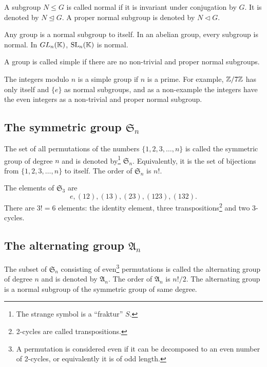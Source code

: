 \begin{definition}
A subgroup $N \leq G$ is called normal if it is invariant under conjugation by $G$. It is denoted by $N \trianglelefteq G$. A proper normal subgroup is denoted by $N \triangleleft G$. 
\end{definition}

\begin{example}
Any group is a normal subgroup to itself. In an abelian group, every subgroup is normal. In $GL_n(\mathbb{K})$, $\text{SL}_n(\mathbb{K})$ is normal.
\end{example}

\begin{definition}
A group is called simple if there are no non-trivial and proper normal subgroups.
\end{definition}

\begin{example}
The integers modulo $n$ is a simple group if $n$ is a prime. For example, $\mathbb{Z}/7\mathbb{Z}$ has only itself and $\{e\}$ as normal subgroups, and as a non-example the integers have the even integers as a non-trivial and proper normal subgroup.
\end{example}

\subsection{The symmetric group $\mathfrak{S}_n$}

The set of all permutations of the numbers $\{1,2,3,\dots,n\}$ is called the symmetric group of degree $n$ and is denoted by\footnote{The strange symbol is a ``fraktur'' $S$.} $\mathfrak{S}_n$. Equivalently, it is the set of bijections from $\{1,2,3,\dots,n\}$ to itself. The order of $\mathfrak{S}_n$ is $n!$. 

\begin{example}
The elements of $\mathfrak{S}_3$ are 
\[
e,(12),(13),(23),(123),(132).
\]
There are $3!=6$ elements: the identity element, three transpositions\footnote{2-cycles are called transpositions.} and two 3-cycles.
\end{example}


\subsection{The alternating group $\mathfrak{A}_n$}

The subset of $\mathfrak{S}_n$ consisting of even\footnote{A permutation is considered even if it can be decomposed to an even number of 2-cycles, or equivalently it is of odd length.} permutations is called the alternating group of degree $n$ and is denoted by $\mathfrak{A}_n$. The order of $\mathfrak{A}_n$ is $n!/2$. The alternating group is a normal subgroup of the symmetric group of same degree.

